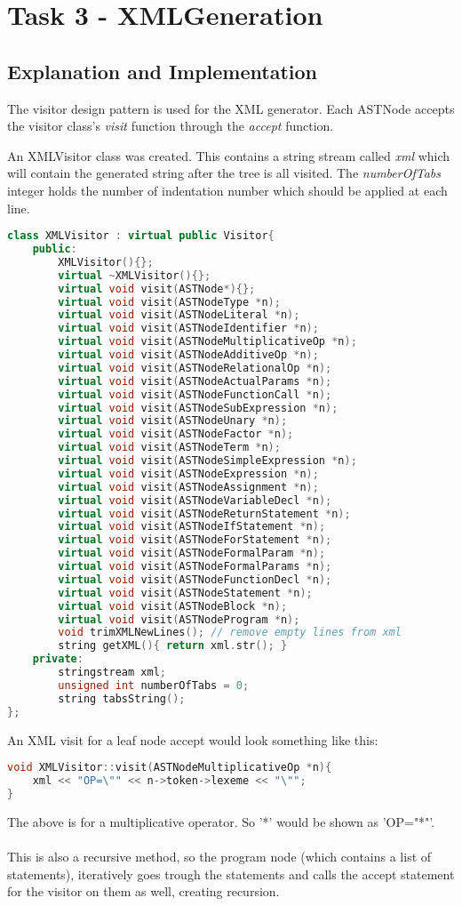\section{Task 3 - XMLGeneration}
\subsection{Explanation and Implementation}

The visitor design pattern is used for the XML generator. Each ASTNode accepts the visitor class's \textit{visit} function through the \textit{accept} function.

An XMLVisitor class was created. This contains a string stream called \textit{xml} which will contain the generated string after the tree is all visited. The \textit{numberOfTabs} integer holds the number of indentation number which should be applied at each line.

\begin{lstlisting}[language=C++]
class XMLVisitor : virtual public Visitor{
	public:
		XMLVisitor(){};
		virtual ~XMLVisitor(){};
		virtual void visit(ASTNode*){};
		virtual void visit(ASTNodeType *n);
		virtual void visit(ASTNodeLiteral *n);
		virtual void visit(ASTNodeIdentifier *n);
		virtual void visit(ASTNodeMultiplicativeOp *n);
		virtual void visit(ASTNodeAdditiveOp *n);
		virtual void visit(ASTNodeRelationalOp *n);
		virtual void visit(ASTNodeActualParams *n);
		virtual void visit(ASTNodeFunctionCall *n);
		virtual void visit(ASTNodeSubExpression *n);
		virtual void visit(ASTNodeUnary *n);
		virtual void visit(ASTNodeFactor *n);
		virtual void visit(ASTNodeTerm *n);
		virtual void visit(ASTNodeSimpleExpression *n);
		virtual void visit(ASTNodeExpression *n);
		virtual void visit(ASTNodeAssignment *n);
		virtual void visit(ASTNodeVariableDecl *n);
		virtual void visit(ASTNodeReturnStatement *n);
		virtual void visit(ASTNodeIfStatement *n);
		virtual void visit(ASTNodeForStatement *n);
		virtual void visit(ASTNodeFormalParam *n);
		virtual void visit(ASTNodeFormalParams *n);
		virtual void visit(ASTNodeFunctionDecl *n);
		virtual void visit(ASTNodeStatement *n);
		virtual void visit(ASTNodeBlock *n);
		virtual void visit(ASTNodeProgram *n);
		void trimXMLNewLines(); // remove empty lines from xml
		string getXML(){ return xml.str(); }
	private:
		stringstream xml;
		unsigned int numberOfTabs = 0;
		string tabsString();
};
\end{lstlisting}

An XML visit for a leaf node accept would look something like this:
\begin{lstlisting}[language=C++]
void XMLVisitor::visit(ASTNodeMultiplicativeOp *n){
	xml << "OP=\"" << n->token->lexeme << "\"";
}
\end{lstlisting}
The above is for a multiplicative operator. So '*' would be shown as 'OP="*"'.
\\\\
This is also a recursive method, so the program node (which contains a list of statements), iteratively goes trough the statements and calls the accept statement for the visitor on them as well, creating recursion.

